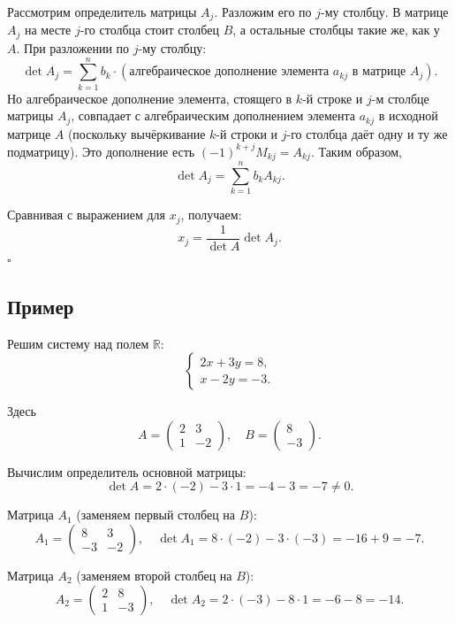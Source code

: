 \documentclass[a4paper,12pt]{article}
\theoremstyle{definition}
\theoremstyle{plain}
\theoremstyle{remark}
\begin{document}
	Рассмотрим определитель матрицы \(A_j\). Разложим его по \(j\)-му столбцу. В матрице \(A_j\) на месте \(j\)-го столбца стоит столбец \(B\), а остальные столбцы такие же, как у \(A\). При разложении по \(j\)-му столбцу:
	\[
	\det A_j = \sum_{k=1}^n b_k \cdot (\text{алгебраическое дополнение элемента } a_{kj} \text{ в матрице } A_j).
	\]
	Но алгебраическое дополнение элемента, стоящего в \(k\)-й строке и \(j\)-м столбце матрицы \(A_j\), совпадает с алгебраическим дополнением элемента \(a_{kj}\) в исходной матрице \(A\) (поскольку вычёркивание \(k\)-й строки и \(j\)-го столбца даёт одну и ту же подматрицу). Это дополнение есть \((-1)^{k+j} M_{kj} = A_{kj}\). Таким образом,
	\[
	\det A_j = \sum_{k=1}^n b_k A_{kj}.
	\]
	
	Сравнивая с выражением для \(x_j\), получаем:
	\[
	x_j = \frac{1}{\det A} \det A_j.
	\]
	\hfill \(\square\)
	
	\subsection{Пример}
	
	Решим систему над полем \(\mathbb{R}\):
	\[
	\begin{cases}
		2x + 3y = 8, \\
		x - 2y = -3.
	\end{cases}
	\]
	
	Здесь
	\[
	A = \begin{pmatrix} 2 & 3 \\ 1 & -2 \end{pmatrix}, \quad B = \begin{pmatrix} 8 \\ -3 \end{pmatrix}.
	\]
	
	Вычислим определитель основной матрицы:
	\[
	\det A = 2 \cdot (-2) - 3 \cdot 1 = -4 - 3 = -7 \neq 0.
	\]
	
	Матрица \(A_1\) (заменяем первый столбец на \(B\)):
	\[
	A_1 = \begin{pmatrix} 8 & 3 \\ -3 & -2 \end{pmatrix}, \quad \det A_1 = 8 \cdot (-2) - 3 \cdot (-3) = -16 + 9 = -7.
	\]
	
	Матрица \(A_2\) (заменяем второй столбец на \(B\)):
	\[
	A_2 = \begin{pmatrix} 2 & 8 \\ 1 & -3 \end{pmatrix}, \quad \det A_2 = 2 \cdot (-3) - 8 \cdot 1 = -6 - 8 = -14.
	\]
	
\end{document}
